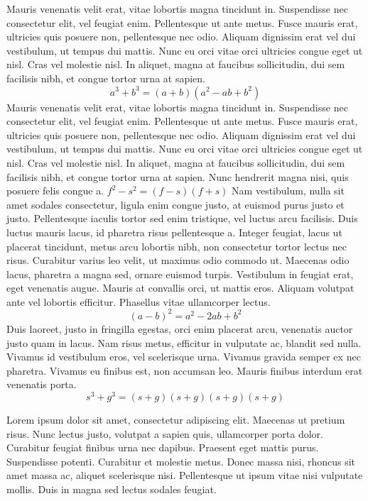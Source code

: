 \documentclass{article}
\begin{document}
Mauris venenatis velit erat, vitae lobortis magna tincidunt in. Suspendisse nec consectetur elit, vel feugiat enim. Pellentesque ut ante metus. Fusce mauris erat, ultricies quis posuere non, pellentesque nec odio. Aliquam dignissim erat vel dui vestibulum, ut tempus dui mattis. Nunc eu orci vitae orci ultricies congue eget ut nisl. Cras vel molestie nisl. In aliquet, magna at faucibus sollicitudin, dui sem facilisis nibh, et congue tortor urna at sapien.
\[ a^{3} + b^{3} = (a+b)(a^{2}-ab+b^{2}) \]
Mauris venenatis velit erat, vitae lobortis magna tincidunt in. Suspendisse nec consectetur elit, vel feugiat enim. Pellentesque ut ante metus. Fusce mauris erat, ultricies quis posuere non, pellentesque nec odio. Aliquam dignissim erat vel dui vestibulum, ut tempus dui mattis. Nunc eu orci vitae orci ultricies congue eget ut nisl. Cras vel molestie nisl. In aliquet, magna at faucibus sollicitudin, dui sem facilisis nibh, et congue tortor urna at sapien.
Nunc hendrerit magna nisi, quis posuere felis congue a.
\begin{math}
    f^{2}-s^{2} = (f - s)(f + s)
\end{math}
Nam vestibulum, nulla sit amet sodales consectetur, ligula enim congue justo, at euismod purus justo et justo. Pellentesque iaculis tortor sed enim tristique, vel luctus arcu facilisis. Duis luctus mauris lacus, id pharetra risus pellentesque a. Integer feugiat, lacus ut placerat tincidunt, metus arcu lobortis nibh, non consectetur tortor lectus nec risus. Curabitur varius leo velit, ut maximus odio commodo ut. Maecenas odio lacus, pharetra a magna sed, ornare euismod turpis. Vestibulum in feugiat erat, eget venenatis augue. Mauris at convallis orci, ut mattis eros. Aliquam volutpat ante vel lobortis efficitur. Phasellus vitae ullamcorper lectus.
\begin{equation}
(a-b)^{2}=a^{2}-2ab+b^{2}
\end{equation}
Duis laoreet, justo in fringilla egestas, orci enim placerat arcu, venenatis auctor justo quam in lacus. Nam risus metus, efficitur in vulputate ac, blandit sed nulla. Vivamus id vestibulum eros, vel scelerisque urna. Vivamus gravida semper ex nec pharetra. Vivamus eu finibus est, non accumsan leo. Mauris finibus interdum erat venenatis porta.
\begin{displaymath}
s^{3} + g^{3} = (s+g)(s+g)(s+g)(s+g)
\end{displaymath}

Lorem ipsum dolor sit amet, consectetur adipiscing elit. Maecenas ut pretium risus. Nunc lectus justo, volutpat a sapien quis, ullamcorper porta dolor. Curabitur feugiat finibus urna nec dapibus. Praesent eget mattis purus. Suspendisse potenti. Curabitur et molestie metus. Donec massa nisi, rhoncus sit amet massa ac, aliquet scelerisque nisi. Pellentesque ut ipsum vitae nisi vulputate mollis. Duis in magna sed lectus sodales feugiat.
\end{document}

